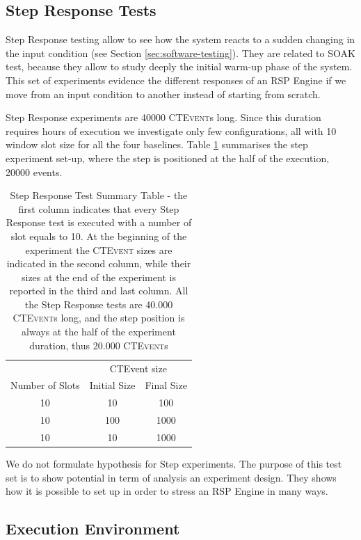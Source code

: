 \subsection{Step Response Tests}\label{sec:step-es}

Step Response testing allow to see how the system reacts to a sudden changing in the input condition (see Section \ref{sec:software-testing}). They are related to SOAK test, because they allow to study deeply the initial warm-up phase of the system. This set of experiments evidence the different responses of an RSP Engine if we move from an input condition to another instead of starting from scratch.

Step Response experiments are 40000 \textsc{CTEvent}s long. Since this duration requires hours of execution we investigate only few configurations, all with 10 window slot size for all the four baselines. Table \ref{tab:steptests} summarises the step experiment set-up, where the step is positioned at the half of the execution, 20000 events.
\begin{table}[htb]
\centering
 \begin{tabular}{c|c|c}
	  	\hline
	  	&\multicolumn{2}{c}{CTEvent size}  \\
		Number of Slots & Initial Size & Final Size\\
		\hline
		\hline
		 10 & 10 & 100\\
		 10 & 100 & 1000\\
		 10 & 10 & 1000\\
		\hline 
 \end{tabular}
 \caption[Step Response Tests Summary Table]{Step Response Test Summary Table -  the first column indicates that every Step Response test is executed with a number of slot equals to 10. At the beginning of the experiment the \textsc{CTEvent} sizes are indicated in the second column, while their sizes at the end of the experiment is reported in the third and last column. All the Step Response tests are 40.000 \textsc{CTEvent}s long, and the step position is always at the half of the experiment duration, thus 20.000 \textsc{CTEvent}s}
\label{tab:steptests}
\end{table}

We do not formulate hypothesis for Step experiments. The purpose of this test set is to show \name potential in term of analysis an experiment design. They shows how it is possible to set up \name in order to stress an RSP Engine in many ways.

\subsection{Execution Environment}\label{sec:execution-environment}

